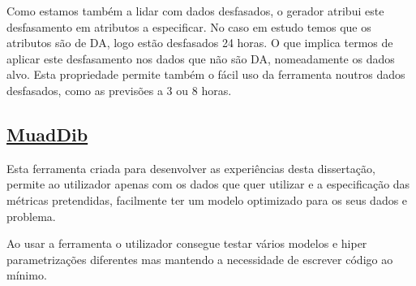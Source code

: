 Como estamos também a lidar com dados desfasados, o gerador atribui este desfasamento em atributos a especificar. No caso em estudo temos que os atributos são de \gls{DA}, logo estão desfasados 24 horas. O que implica termos de aplicar este desfasamento nos dados que não são \gls{DA}, nomeadamente os dados alvo. Esta propriedade permite também o fácil uso da ferramenta noutros dados desfasados, como as previsões a 3 ou 8 horas.\par

\subsection{\href{https://github.com/alquimodelia/MuadDib}{MuadDib}\label{se:muaddib}}

Esta ferramenta criada para desenvolver as experiências desta dissertação, permite ao utilizador apenas com os dados que quer utilizar e a especificação das métricas pretendidas, facilmente ter um modelo optimizado para os seus dados e problema.\par
Ao usar a ferramenta o utilizador consegue testar vários modelos e hiper parametrizações diferentes mas mantendo a necessidade de escrever código ao mínimo.\par
